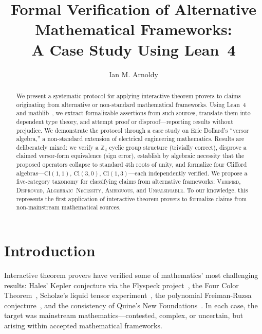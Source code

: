 \documentclass[runningheads]{llncs}
\begin{document}
\title{Formal Verification of Alternative Mathematical Frameworks:\\
A Case Study Using Lean~4}

\author{Ian M. Arnoldy}

\maketitle

\begin{abstract}
We present a systematic protocol for applying interactive theorem provers to
claims originating from alternative or non-standard mathematical frameworks.
Using Lean~4~\cite{demoura2021lean4} and mathlib~\cite{mathlib}, we extract formalizable assertions from such sources,
translate them into dependent type theory, and attempt proof or disproof---reporting
results without prejudice. We demonstrate the protocol through a case study on
Eric Dollard's ``versor algebra,'' a non-standard extension of electrical
engineering mathematics. Results are deliberately mixed: we verify a $\mathbb{Z}_4$
cyclic group structure (trivially correct), disprove a claimed versor-form
equivalence (sign error), establish by algebraic necessity that the proposed
operators collapse to standard 4th roots of unity, and formalize four
Clifford algebras---$\mathrm{Cl}(1,1)$, $\mathrm{Cl}(3,0)$,
$\mathrm{Cl}(1,3)$---each independently verified. We propose a
five-category taxonomy for classifying claims from alternative frameworks:
\textsc{Verified}, \textsc{Disproved}, \textsc{Algebraic~Necessity},
\textsc{Ambiguous}, and \textsc{Unfalsifiable}. To our knowledge, this represents
the first application of interactive theorem provers to formalize claims from
non-mainstream mathematical sources.
\end{abstract}


\section{Introduction}
\label{sec:intro}

Interactive theorem provers have verified some of mathematics' most challenging
results: Hales' Kepler conjecture via the Flyspeck project~\cite{hales2017formal},
the Four Color Theorem~\cite{gonthier2008four}, Scholze's liquid tensor
experiment~\cite{commelin2022liquid}, the polynomial Freiman-Ruzsa
conjecture~\cite{tao2023pfr}, and the consistency of Quine's New
Foundations~\cite{wilshaw2024nf}. In each case, the target was mainstream
mathematics---contested, complex, or uncertain, but arising within accepted
mathematical frameworks.
\end{document}
